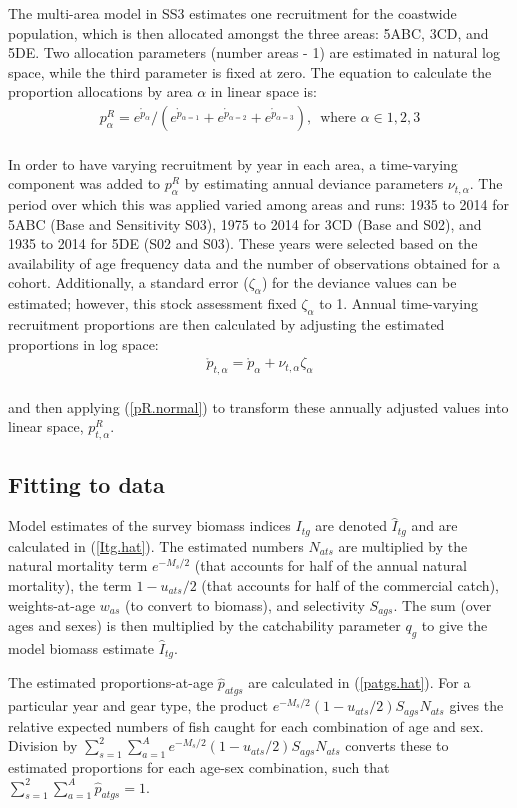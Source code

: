 \documentclass[11pt]{book}
\def\vsd{\vspace*{1ex}}%
\newcommand{\eref}[1]{(\ref{#1})}
\renewcommand{\eb}{\vsd \vsd \begin{eqnarray}}
\renewcommand{\ee}{\end{eqnarray} \vsd }
\begin{document}
The multi-area model in SS3 estimates one recruitment for the coastwide population, which is then allocated amongst the three areas: 5ABC, 3CD, and 5DE. 
Two allocation parameters (number areas - 1) are estimated in natural log space, while the third parameter is fixed at zero. 
The equation to calculate the proportion allocations by area $\alpha$ in linear space is:
\eb
p^{R}_{\alpha} = e^{\mathring{p}_{\alpha}} / ( e^{\mathring{p}_{\alpha=1}} + e^{\mathring{p}_{\alpha=2}} + e^{\mathring{p}_{\alpha=3}} ) \text{,~~where~} \alpha \in{1,2,3}
\label{pR.normal}
\ee \\[-0.25ex]
In order to have varying recruitment by year in each area, a time-varying component was added to $p^{R}_{\alpha}$ by estimating annual deviance parameters $\nu_{t,\alpha}$.
The period over which this was applied varied among areas and runs: 1935 to 2014 for 5ABC (Base and Sensitivity S03), 1975 to 2014 for 3CD (Base and S02), and 1935 to 2014 for 5DE (S02 and S03).
These years were selected based on the availability of age frequency data and the number of observations obtained for a cohort.
Additionally, a standard error ($\zeta_{\alpha}$) for the deviance values can be estimated; however, this stock assessment fixed $\zeta_{\alpha}$ to 1. 
Annual time-varying recruitment proportions are then calculated by adjusting the estimated proportions in log space:
\eb
\mathring{p}_{t,\alpha} = \mathring{p}_{\alpha} + \nu_{t,\alpha} \zeta_{\alpha}
\label{pR.tv}
\ee \\[-0.25ex]
and then applying \eref{pR.normal} to transform these annually adjusted values into linear space, $p^{R}_{t,\alpha}$.

\subsection{Fitting to data}

Model estimates of the survey biomass indices $I_{tg}$ are denoted $\widehat{I}_{tg}$ and are calculated in \eref{Itg.hat}.
The estimated numbers $N_{ats}$ are multiplied by the natural mortality term $e^{-M_s / 2}$ (that accounts for half of the annual natural mortality), the term $1 - u_{ats} / 2$ (that accounts for half of the commercial catch),  weights-at-age $w_{as}$ (to convert to biomass), and selectivity $S_{ags}$. 
The sum (over ages and sexes) is then multiplied by the catchability parameter $q_g$ to give the model biomass estimate $\widehat{I}_{tg}$. 

The estimated proportions-at-age $\widehat{p}_{atgs}$ are calculated in \eref{patgs.hat}. 
For a particular year and gear type, the product $e^{-M_{s}/2} (1 - u_{ats}/2) S_{ags} N_{ats}$ gives the relative expected numbers of fish caught for each combination of age and sex. 
Division by $\sum_{s=1}^2 \sum_{a=1}^A e^{-M_{s}/2} (1 - u_{ats}/2) S_{ags} N_{ats}$ converts these to estimated proportions for each age-sex combination, such that $\sum_{s=1}^2 \sum_{a=1}^{A} \widehat{p}_{atgs} = 1$.
\end{document}
